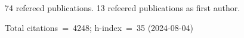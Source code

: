 74 refereed publications. 13 refeered publications as first author.

Total citations~=~4248; h-index~=~35 (2024-08-04)